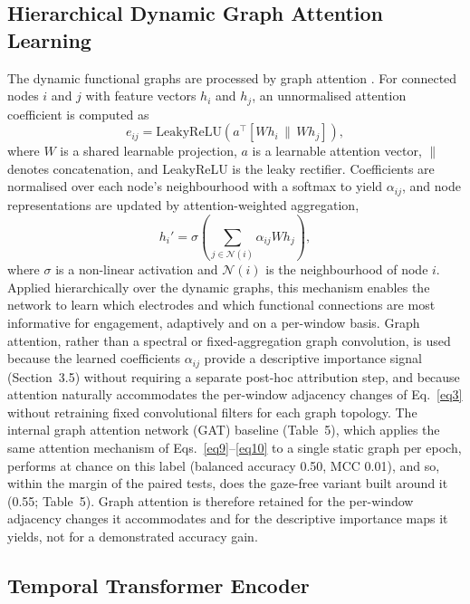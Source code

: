 \documentclass[pdflatex,sn-basic,Numbered]{sn-jnl}
\begin{document}
\subsection{Hierarchical Dynamic Graph Attention Learning}\label{subsec2.5.5}

The dynamic functional graphs are processed by graph attention \cite{ref43}. For connected nodes $i$ and $j$ with feature vectors $h_i$ and $h_j$, an unnormalised attention coefficient is computed as
\begin{equation}
e_{ij} = \mathrm{LeakyReLU}\!\left(a^\top [W h_i \,\|\, W h_j]\right), \label{eq9}
\end{equation}
where $W$ is a shared learnable projection, $a$ is a learnable attention vector, $\|$ denotes concatenation, and LeakyReLU is the leaky rectifier. Coefficients are normalised over each node's neighbourhood with a softmax to yield $\alpha_{ij}$, and node representations are updated by attention-weighted aggregation,
\begin{equation}
h_i' = \sigma\!\left( \sum_{j \in \mathcal{N}(i)} \alpha_{ij} W h_j \right), \label{eq10}
\end{equation}
where $\sigma$ is a non-linear activation and $\mathcal{N}(i)$ is the neighbourhood of node $i$. Applied hierarchically over the dynamic graphs, this mechanism enables the network to learn which electrodes and which functional connections are most informative for engagement, adaptively and on a per-window basis. Graph attention, rather than a spectral or fixed-aggregation graph convolution, is used because the learned coefficients $\alpha_{ij}$ provide a descriptive importance signal (Section~3.5) without requiring a separate post-hoc attribution step, and because attention naturally accommodates the per-window adjacency changes of Eq.~\eqref{eq3} without retraining fixed convolutional filters for each graph topology. The internal graph attention network (GAT) baseline (Table~5), which applies the same attention mechanism of Eqs.~\eqref{eq9}--\eqref{eq10} to a single static graph per epoch, performs at chance on this label (balanced accuracy 0.50, MCC 0.01), and so, within the margin of the paired tests, does the gaze-free variant built around it (0.55; Table~5). Graph attention is therefore retained for the per-window adjacency changes it accommodates and for the descriptive importance maps it yields, not for a demonstrated accuracy gain.


\subsection{Temporal Transformer Encoder}\label{subsec2.5.6}
\end{document}
